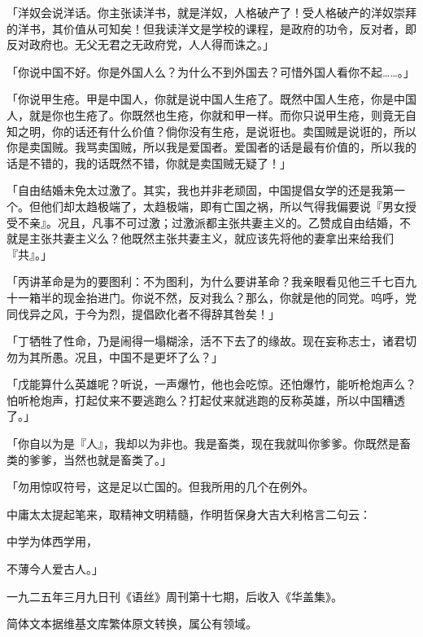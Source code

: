 \documentclass[12pt]{article}
\begin{document}
「洋奴会说洋话。你主张读洋书，就是洋奴，人格破产了！受人格破产的洋奴崇拜的洋书，其价值从可知矣！但我读洋文是学校的课程，是政府的功令，反对者，即反对政府也。无父无君之无政府党，人人得而诛之。」

「你说中国不好。你是外国人么？为什么不到外国去？可惜外国人看你不起……。」

「你说甲生疮。甲是中国人，你就是说中国人生疮了。既然中国人生疮，你是中国人，就是你也生疮了。你既然也生疮，你就和甲一样。而你只说甲生疮，则竟无自知之明，你的话还有什么价值？倘你没有生疮，是说诳也。卖国贼是说诳的，所以你是卖国贼。我骂卖国贼，所以我是爱国者。爱国者的话是最有价值的，所以我的话是不错的，我的话既然不错，你就是卖国贼无疑了！」

「自由结婚未免太过激了。其实，我也并非老顽固，中国提倡女学的还是我第一个。但他们却太趋极端了，太趋极端，即有亡国之祸，所以气得我偏要说『男女授受不亲』。况且，凡事不可过激；过激派都主张共妻主义的。乙赞成自由结婚，不就是主张共妻主义么？他既然主张共妻主义，就应该先将他的妻拿出来给我们『共』。」

「丙讲革命是为的要图利：不为图利，为什么要讲革命？我亲眼看见他三千七百九十一箱半的现金抬进门。你说不然，反对我么？那么，你就是他的同党。呜呼，党同伐异之风，于今为烈，提倡欧化者不得辞其咎矣！」

「丁牺牲了性命，乃是闹得一塌糊涂，活不下去了的缘故。现在妄称志士，诸君切勿为其所愚。况且，中国不是更坏了么？」

「戊能算什么英雄呢？听说，一声爆竹，他也会吃惊。还怕爆竹，能听枪炮声么？怕听枪炮声，打起仗来不要逃跑么？打起仗来就逃跑的反称英雄，所以中国糟透了。」

「你自以为是『人』，我却以为非也。我是畜类，现在我就叫你爹爹。你既然是畜类的爹爹，当然也就是畜类了。」

「勿用惊叹符号，这是足以亡国的。但我所用的几个在例外。

中庸太太提起笔来，取精神文明精髓，作明哲保身大吉大利格言二句云：

中学为体西学用，

不薄今人爱古人。」

\vspace{0.6em}
{\small 一九二五年三月九日刊《语丝》周刊第十七期，后收入《华盖集》。

简体文本据维基文库繁体原文转换，属公有领域。}

\end{document}
